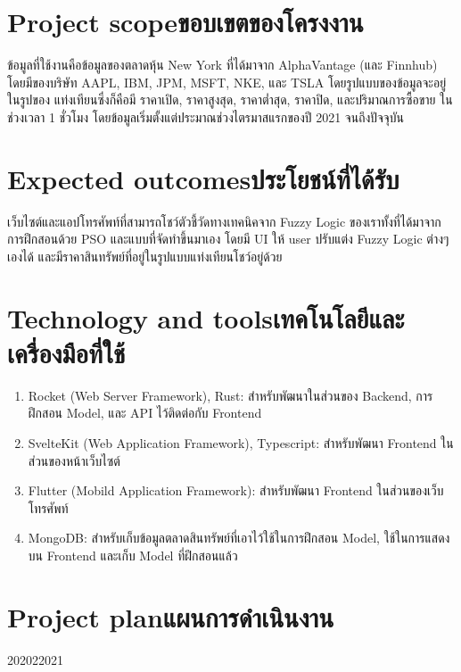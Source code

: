 \section{\ifenglish Project scope\else ขอบเขตของโครงงาน\fi}
ข้อมูลที่ใช้งานคือข้อมูลของตลาดหุ้น New York ที่ได้มาจาก AlphaVantage (และ Finnhub) โดยมีของบริษัท AAPL, IBM, JPM, MSFT, NKE, และ TSLA โดยรูปแบบของข้อมูลจะอยู่ในรูปของ
แท่งเทียนซึ่งก็คือมี ราคาเปิด, ราคาสูงสุด, ราคาต่ำสุด, ราคาปิด, และปริมาณการซื้อขาย ในช่วงเวลา 1 ชั่วโมง โดยข้อมูลเริ่มตั้งแต่ประมาณช่วงไตรมาสแรกของปี 2021 จนถึงปัจจุบัน

\section{\ifenglish Expected outcomes\else ประโยชน์ที่ได้รับ\fi}
เว็บไซต์และแอปโทรศัพท์ที่สามารถโชว์ตัวชี้วัดทางเทคนิคจาก Fuzzy Logic ของเราทั้งที่ได้มาจากการฝึกสอนด้วย PSO และแบบที่จัดทำขึ้นมาเอง 
โดยมี UI ให้ user ปรับแต่ง Fuzzy Logic ต่างๆ เองได้ และมีราคาสินทรัพย์ที่อยู่ในรูปแบบแท่งเทียนโชว์อยู่ด้วย

\section{\ifenglish Technology and tools\else เทคโนโลยีและเครื่องมือที่ใช้\fi}
\begin{enumerate}
    \item Rocket (Web Server Framework), Rust: สำหรับพัฒนาในส่วนของ Backend, การฝึกสอน Model, และ API ไว้ติดต่อกับ Frontend
    \item SvelteKit (Web Application Framework), Typescript: สำหรับพัฒนา Frontend ในส่วนของหน้าเว็บไซต์
    \item Flutter (Mobild Application Framework): สำหรับพัฒนา Frontend ในส่วนของเว็บโทรศัพท์
    \item MongoDB: สำหรับเก็บข้อมูลตลาดสินทรัพย์ที่เอาไว้ใช้ในการฝึกสอน Model, ใช้ในการแสดงบน Frontend และเก็บ Model ที่ฝึกสอนแล้ว
\end{enumerate}

\section{\ifenglish Project plan\else แผนการดำเนินงาน\fi}

\begin{plan}{6}{2020}{2}{2021}
\end{plan}

